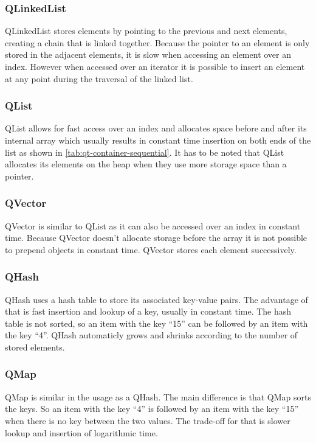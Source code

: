 \subsubsection{QLinkedList}
\label{sec:QLikedList}
QLinkedList stores elements by pointing to the previous and next elements, creating a chain that is linked together. Because the pointer to an element is only stored in the adjacent elements, it is slow when accessing an element over an index. However when accessed over an iterator it is possible to insert an element at any point during the traversal of the linked list.

\subsubsection{QList}
\label{sec:QList}
QList allows for fast access over an index and allocates space before and after its internal array which usually results in constant time insertion on both ends of the list as shown in \ref{tab:qt-container-sequential}. It has to be noted that QList allocates its elements on the heap when they use more storage space than a pointer.\cite{QtDoc:QList}
\subsubsection{QVector}
\label{sec:QVector}
QVector is similar to QList as it can also be accessed over an index in constant time. Because QVector doesn't allocate storage before the array it is not possible to prepend objects in constant time. QVector stores each element successively.
\subsubsection{QHash}
\label{sec:QHash}
QHash uses a hash table to store its associated key-value pairs. The advantage of that is fast insertion and lookup of a key, usually in constant time. The hash table is not sorted, so an item with the key ``15'' can be followed by an item with the key ``4''. QHash automaticly grows and shrinks according to the number of stored elements. 
\subsubsection{QMap}
\label{sec:QMap}
QMap is similar in the usage as a QHash. The main difference is that QMap sorts the keys. So an item with the key ``4'' is followed by an item with the key ``15'' when there is no key between the two values. The trade-off for that is slower lookup and insertion of logarithmic time.
